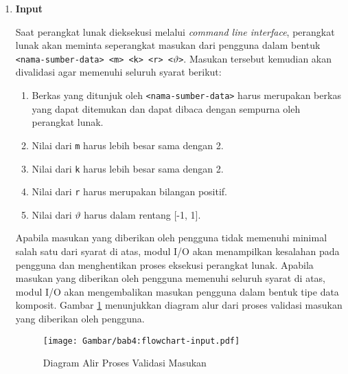 \begin{enumerate}
    \item \textbf{Input}
    
    Saat perangkat lunak dieksekusi melalui \textit{command line interface}, perangkat lunak akan meminta seperangkat masukan dari pengguna dalam bentuk \texttt{<nama-sumber-data> <m> <k> <r> <$\vartheta$>}. Masukan tersebut kemudian akan divalidasi agar memenuhi seluruh syarat berikut:
    
    \begin{enumerate}
        \item Berkas yang ditunjuk oleh \texttt{<nama-sumber-data>} harus merupakan berkas yang dapat ditemukan dan dapat dibaca dengan sempurna oleh perangkat lunak.
        \item Nilai dari \texttt{m} harus lebih besar sama dengan 2.
        \item Nilai dari \texttt{k} harus lebih besar sama dengan 2.
        \item Nilai dari \texttt{r} harus merupakan bilangan positif.
        \item Nilai dari $\vartheta$ harus dalam rentang [-1, 1].
    \end{enumerate}
    
    Apabila masukan yang diberikan oleh pengguna tidak memenuhi minimal salah satu dari syarat di atas, modul I/O akan menampilkan kesalahan pada pengguna dan menghentikan proses eksekusi perangkat lunak. Apabila masukan yang diberikan oleh pengguna memenuhi seluruh syarat di atas, modul I/O akan mengembalikan masukan pengguna dalam bentuk tipe data komposit. Gambar \ref{bab4:flowchart-input} menunjukkan diagram alur dari proses validasi masukan yang diberikan oleh pengguna.
    
    \iffalse
    
    Untuk mempermudah proses implementasi perangkat lunak, fungsionalitas ini akan diimplementasikan menggunakan bantuan pustaka C++ yang bernama \texttt{argparse}. Pustaka \texttt{argparse} dipilih karena memiliki kemampuan untuk mempermudah konversi tipe data menjadi tipe data yang sesuai serta menyediakan fitur untuk menampilkan bantuan penggunaan perangkat lunak dalam bentuk \textit{command line interface} pada pengguna.
    
    \fi
    
    \begin{figure}[t]
        \centering
        \texttt{[image: Gambar/bab4:flowchart-input.pdf]}
        \caption{Diagram Alir Proses Validasi Masukan}
        \label{bab4:flowchart-input}
    \end{figure}
    

\end{enumerate}
